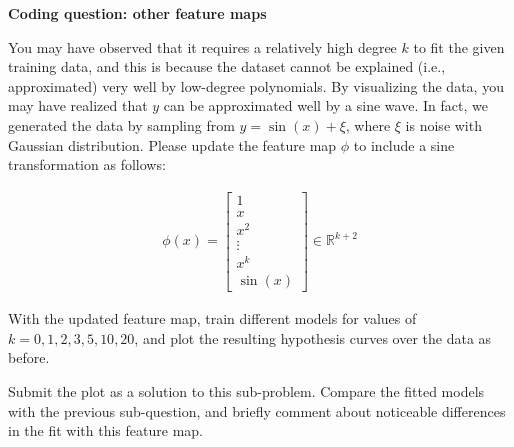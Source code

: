 \newpage

\item {} {\bf Coding question: other feature maps}

You may have observed that it requires a relatively high degree $k$ to fit the given training data, and this is because the dataset cannot be explained (i.e., approximated) very well by low-degree polynomials. By visualizing the data, you may have realized that $y$ can be approximated well by a sine wave. In fact, we generated the data by sampling from $y = \sin(x) + \xi$, where $\xi$ is noise with Gaussian distribution. Please update the feature map $\phi$ to include a sine transformation as follows:

\begin{align}
  \phi(x) = \left[\begin{array}{c} 1\\ x \\ x^2\\ \vdots \\x^k \\ \sin(x) \end{array}\right]\in \mathbb{R}^{k+2} \label{eqn:feature-sine}
\end{align}

With the updated feature map, train different models for values of $k=0,1,2,3,5,10,20$, and plot the resulting hypothesis curves over the data as before.

Submit the plot as a solution to this sub-problem. Compare the fitted models with the previous sub-question, and briefly comment about noticeable differences in the fit with this feature map.

